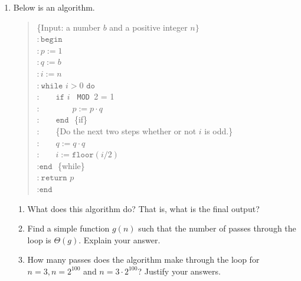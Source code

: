 \documentclass{article}
\renewcommand{\mod}{\texttt{ MOD }}
\newcommand{\ttend}{\texttt{end }}
\begin{document}
\begin{enumerate}
\item Below is an algorithm. 
\begin{quote}
\{Input: a number $b$ and a positive integer $n\}$\\
:$\,\texttt{begin}$\\
:$\, p:=1$\\
:$\, q:=b$\\
:$\, i:=n$\\
:$\:\texttt{while}$ $i>0$ $\texttt{do}$\\
:$\qquad\texttt{if } i$ \mod 2 = 1 \\
:$\qquad \qquad p:=p\cdot q$\\
:$\qquad \ttend$ \{if\} \\
:$\qquad$\{Do the next two steps whether or not $i$ is odd.\}\\
:$\qquad q:=q\cdot q$\\
:$\qquad i:= \texttt{floor}(i/2)$\\
:$\texttt{end }$ \{while\} \\
:$\:\texttt{return }p$\\
:$\texttt{end }$
\end{quote}

\begin{enumerate}
\item What does this algorithm do?  That is, what is the final output?
\item Find a simple function $g(n)$ such that the number of passes through the loop is $\Theta(g)$. Explain your answer.
\item How many passes does the algorithm make through the loop for $n=3, n=2^{100}$ and $n=3\cdot2^{100}$?  Justify your answers.
\end{enumerate}


\end{enumerate}
\end{document}
